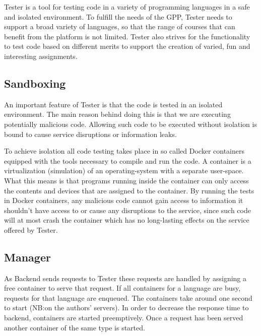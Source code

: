 Tester is a tool for testing code in a variety of programming languages in a safe and isolated environment. To fulfill the needs of the GPP, Tester needs to support a  broad variety of languages, so that the range of courses that can benefit from the platform is not limited. Tester also strives for the functionality to test code based on different merits to support the creation of varied, fun and interesting assignments.

\subsection{Sandboxing}
An important feature of Tester is that the code is tested in an isolated environment. The main reason behind doing this is that we are executing potentially malicious code. Allowing such code to be executed without isolation is bound to cause service disruptions or information leaks.

To achieve isolation all code testing takes place in so called Docker containers equipped with the tools necessary to compile and run the code. A container is a virtualization (simulation) of an operating-system with a separate user-space. What this means is that programs running inside the container can only access the contents and devices that are assigned to the container. By running the tests in Docker containers, any malicious code cannot gain access to information it shouldn't have access to or cause any disruptions to the service, since such code will at most crash the container which has no long-lasting effects on the service offered by Tester.
\subsection{Manager}

As Backend sends requests to Tester these requests are handled by assigning a free container to serve that request.
If all containers for a language are busy, requests for that language are enqueued. 
The containers take around one second to start (NB:\@ on the authors' servers). In order to decrease the response time to backend,
containers are started preemptively. Once a request has been served another container of the same type is started.

